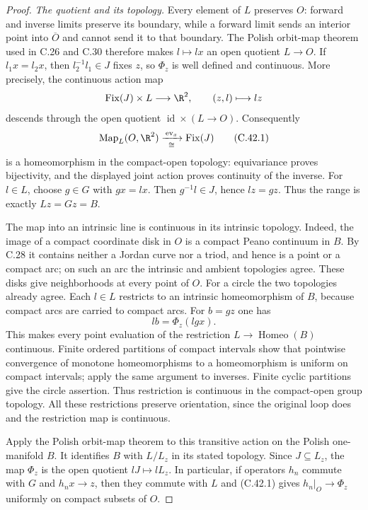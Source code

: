 \begin{proof}
\emph{The quotient and its topology.}
Every element of $L$ preserves $O$: forward and inverse
limits preserve its boundary, while a forward limit
sends an interior point into $\overline O$ and cannot
send it to that boundary. The Polish orbit-map theorem
used in C.26 and C.30 therefore makes $l\mapsto lx$
an open quotient $L\to O$.
If $l_1x=l_2x$, then $l_2^{-1}l_1\in J$ fixes $z$,
so $\Phi_z$ is well defined and continuous.
More precisely, the continuous action map
\[
 \operatorname{Fix}(J)\times L\longrightarrow\R^2,
 \qquad (z,l)\longmapsto lz
\]
descends through the open quotient
$\operatorname{id}\times(L\to O)$.
Consequently
\[
 \operatorname{Map}_L(O,\R^2)
       \xrightarrow[\cong]{\,\operatorname{ev}_x\,}
       \operatorname{Fix}(J)
                                                        \tag{C.42.1}
\]
is a homeomorphism in the compact-open topology:
equivariance proves bijectivity, and the displayed
joint action proves continuity of the inverse.
For $l\in L$, choose $g\in G$ with $gx=lx$.
Then $g^{-1}l\in J$, hence $lz=gz$.
Thus the range is exactly $Lz=Gz=B$.

The map into an intrinsic line is continuous in its
intrinsic topology. Indeed, the image of a compact
coordinate disk in $O$ is a compact Peano continuum
in $B$. By C.28 it contains neither a Jordan curve
nor a triod, and hence is a point or a compact arc;
on such an arc the intrinsic and ambient topologies
agree. These disks give neighborhoods at every point
of $O$. For a circle the two topologies already agree.
Each $l\in L$ restricts to an intrinsic homeomorphism
of $B$, because compact arcs are carried to compact
arcs. For $b=gz$ one has
\[
                  lb=\Phi_z(lgx).
                                                        \tag{C.42.2}
\]
This makes every point evaluation of the restriction
$L\to\operatorname{Homeo}(B)$ continuous.
Finite ordered partitions of compact intervals show
that pointwise convergence of monotone homeomorphisms
to a homeomorphism is uniform on compact intervals;
apply the same argument to inverses. Finite cyclic
partitions give the circle assertion. Thus restriction
is continuous in the compact-open group topology.
All these restrictions preserve orientation, since
the original loop does and the restriction map is
continuous.

Apply the Polish orbit-map theorem to this transitive
action on the Polish one-manifold $B$. It identifies
$B$ with $L/L_z$ in its stated topology. Since
$J\subseteq L_z$, the map $\Phi_z$ is the open quotient
$lJ\mapsto lL_z$.
In particular, if operators $h_n$ commute with $G$
and $h_nx\to z$, then they commute with $L$ and
(C.42.1) gives $h_n|_O\to\Phi_z$ uniformly on compact
subsets of $O$.


\end{proof}
